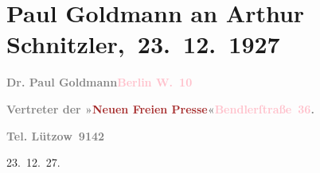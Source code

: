 

\renewcommand{\erwaehntePersonen}{Personen: Franziska Goldmann, Eva Marie Goldmann}
\renewcommand{\erwaehnteInstitutionen}{Institutionen: Neue Freie Presse, Phaidon-Verlag, Österreichische Journal A.G.}
\renewcommand{\erwaehnteOrte}{Orte: Akademietheater, Bendlerstraße, Berlin, Wien}
\renewcommand{\erwaehnteWerke}{Werke: Buch der Sprüche und Bedenken, Es ist mein Wille{\rufezeichen} Eine unwahrscheinliche Begebenheit aus dem 18. Jahrhundert in einem Akt}
\section[ Paul Goldmann an Arthur Schnitzler, 23. 12. 1927]{Paul Goldmann an Arthur Schnitzler, 23. 12. 1927}
\nopagebreak{}
\rehead{ }\normalsize\beginnumbering{}
\toendnotes[C]{\smallbreak\pagebreak[2]}
\toendnotes[C]{\smallbreak}
\pstart
           \noindent{}{\pb}\textcolor{gray}{\textbf{Dr. Paul Goldmann}}\hfill \textcolor{gray}{\textbf{\textcolor{pink}{Berlin W. 10}{}\ledrightnote{\textcolor{pink}{Berlin}}}}\pend
           
\pstart
           \textcolor{gray}{\textbf{Vertreter der »\textcolor{brown}{Neuen Freien
                           Presse}{}\ledrightnote{\textcolor{brown}{Neue Freie Presse}}«}}\hfill \textcolor{gray}{\textbf{\textcolor{pink}{Bendlerſtraße 36}{}\ledrightnote{\textcolor{pink}{Bendlerstraße}}.}}\pend
           
\pstart
           \raggedleft{}\textcolor{gray}{\textbf{Tel. Lützow 9142}}\pend
           
\pstart
           \raggedleft{}23. 12. 27.\pend
           
